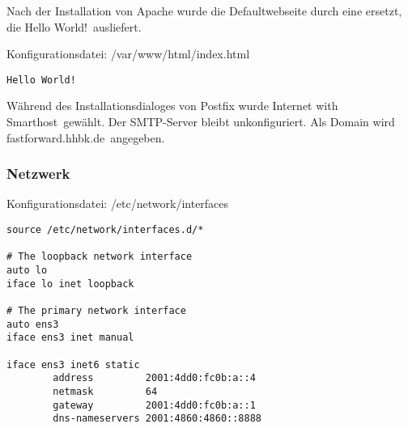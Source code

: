 Nach der Installation von Apache wurde die Defaultwebseite durch eine ersetzt, die \ql Hello World!\qr\ ausliefert.

Konfigurationsdatei: {\sc /var/www/html/index.html}
\begin{lstlisting}
Hello World!
\end{lstlisting}

Während des Installationsdialoges von Postfix wurde \ql Internet with Smarthost\qr\ gewählt. Der SMTP-Server bleibt unkonfiguriert. Als Domain wird \q fastforward.hhbk.de\qr\ angegeben.

\subsubsection{Netzwerk}

Konfigurationsdatei: {\sc /etc/network/interfaces}
\begin{lstlisting}
source /etc/network/interfaces.d/*

# The loopback network interface
auto lo
iface lo inet loopback

# The primary network interface
auto ens3
iface ens3 inet manual

iface ens3 inet6 static
        address			2001:4dd0:fc0b:a::4
        netmask			64
        gateway			2001:4dd0:fc0b:a::1
        dns-nameservers	2001:4860:4860::8888
\end{lstlisting}

